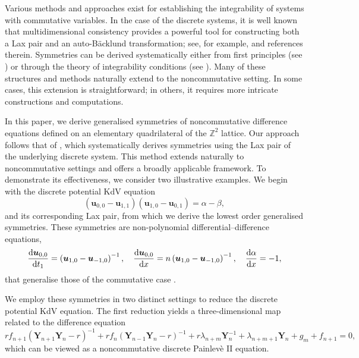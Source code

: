 \documentclass[dvips,10pt]{article}
\newcommand{\bs}{\boldsymbol}
\newcommand{\bsY}{ {\bs{Y}}}
\theoremstyle{remark} %
\begin{document}
	Various methods and approaches exist for establishing the integrability of systems with commutative variables. In the case of the discrete systems, it is well known that multidimensional consistency provides a powerful tool for constructing both a Lax pair and an auto-B\"acklund transformation; see, for example, \cite{HJN} and references therein. Symmetries can be derived systematically either from first principles (see \cite{FX,TTX2}) or through the theory of integrability conditions (see \cite{BX,LY,MWX,MX,X}). Many of these structures and methods naturally extend to the noncommutative setting. In some cases, this extension is straightforward; in others, it requires more intricate constructions and computations. 
		
	In this paper, we derive generalised symmetries of noncommutative difference equations defined on an elementary quadrilateral of the ${\mathbb{Z}}^2$ lattice. Our approach follows that of \cite{FX}, which systematically derives symmetries using the Lax pair of the underlying discrete system. This method extends naturally to noncommutative settings and offers a broadly applicable framework. To demonstrate its effectiveness, we consider two illustrative examples. We begin with the discrete potential KdV equation \cite{FNC,Betal}
	\begin{equation*}
		\left({\bs{u}}_{0,0} - {\bs{u}}_{1,1}\right) \left( {\bs{u}}_{1,0}-{\bs{u}}_{0,1}\right) = \alpha - \beta,
	\end{equation*}
	and its corresponding Lax pair, from which we derive the lowest order generalised symmetries. These symmetries are non-polynomial differential–difference equations,
	$$	\frac{{\rm{d}} {\bs{u}}_{0,0}}{{\rm{d}} t_1} =  \left({\bs{u}}_{1,0}- {\bs{u}}_{-1,0}\right)^{-1}, ~~~	\frac{{\rm{d}} {\bs{u}}_{0,0}}{{\rm{d}} x} =  n \left({\bs{u}}_{1,0}- {\bs{u}}_{-1,0}\right)^{-1}, ~~~ 	\frac{{\rm{d}} \alpha}{{\rm{d}} x} = -1, $$
	that generalise those of the commutative case \cite{TTX2}.
	
	We employ these symmetries in two distinct settings to reduce the discrete potential KdV equation. The first reduction yields a three-dimensional map related to the difference equation
	\begin{equation*} 
		r f_{n+1} \left( \bsY_{n+1} \bsY_n - r \right)^{-1} + r f_{n} \left( \bsY_{n-1} \bsY_n - r \right)^{-1}  + r \lambda_{n+m} \bsY_n^{-1} + \lambda_{n+m+1} \bsY_n + g_m + f_{n+1} = 0,
	\end{equation*}
	which can be viewed as a noncommutative discrete Painlev\`e II equation. 
	
\end{document}
